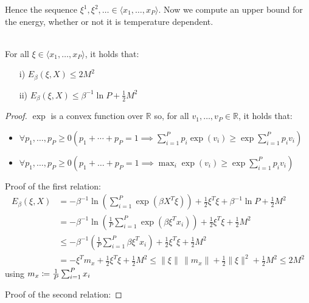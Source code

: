 \noindent Hence the sequence $\xi^1,\xi^2,\ldots\in\langle{x_1,\ldots,x_P}\rangle$. Now we compute an upper bound for the energy, whether or not it is temperature dependent.
\begin{lemma} \\
    For all $\xi\in\langle{x_1,\ldots,x_P}\rangle$, it holds that:
    \begin{itemize}[itemsep=2pt, topsep=10pt]
        \item[i)]
        $E_\beta\left(\xi,X\right)\leq2 M^2$
        \item[ii)] $E_\beta\left(\xi,X\right)\leq\beta^{-1}\ln P + \frac12 M^2$
    \end{itemize}
    \begin{proof}
        $\exp$ is a convex function over $\mathbb{R}$ so, for all $v_1,\ldots,v_P\in\mathbb{R}$, it holds that:
        \begin{itemize}[itemsep=2pt, topsep=10pt]
            \item $\forall{p_1,\ldots,p_P}\geq0\left(p_1+\cdots+p_P=1\implies\sum_{i=1}^{P}p_i\exp\left(v_i\right)\geq\exp\sum_{i=1}^{P}p_iv_i\right)$
            \item $\forall{p_1,\ldots,p_P}\geq0\left(p_1+\ldots+p_P=1\implies\max_i\exp\left(v_i\right)\geq\exp\sum_{i=1}^{P}p_iv_i\right)$
        \end{itemize}

        \noindent Proof of the first relation:
        \begin{align*}
            E_\beta\left(\xi,X\right) &= -\beta^{-1}\ln\left(\sum_{i=1}^{P}\exp\left(\beta X^T\xi\right)\right) + \frac12\xi^T\xi + \beta^{-1}\ln P + \frac12 M^2 \\
            &= -\beta^{-1}\ln\left(\frac{1}{P}\sum_{i=1}^{P}\exp\left(\beta\xi^Tx_i\right)\right)+\frac12\xi^T\xi+\frac12M^2 \\
            &\leq -\beta^{-1}\left(\frac{1}{P}\sum_{i=1}^{P}\beta\xi^Tx_i\right)+\frac12\xi^T\xi+\frac12M^2 \\
            &= -\xi^Tm_x + \frac12\xi^T\xi+\frac12M^2 \leq \|\xi\|\,\|m_x\| + \frac12\|\xi\|^2+\frac12M^2\leq2M^2
        \end{align*}
        using $m_x \coloneqq \frac{1}{P}\sum_{i=1}^{P}x_i $

        \noindent Proof of the second relation:


\end{proof}
\end{lemma}
